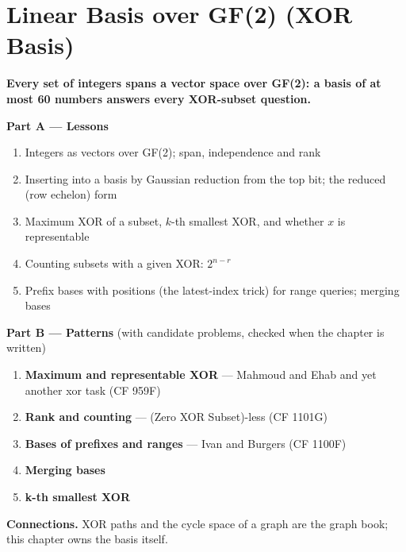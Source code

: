 \chapter{Linear Basis over GF(2) (XOR Basis)}
\label{ch:linear_basis}

\begin{tcolorbox}[enhanced, colback=white, colframe=secondaryblue, boxrule=1pt, arc=2mm]
\textbf{\large\textcolor{primaryblue}{Every set of integers spans a vector space over GF(2): a basis of at most 60 numbers answers every XOR-subset question.}}
\end{tcolorbox}


\begin{plannedbox}
\textbf{Part A --- Lessons}
\begin{enumerate}[leftmargin=*, label=\textbf{A\arabic*.}, itemsep=1pt]
    \item Integers as vectors over GF(2); span, independence and rank
    \item Inserting into a basis by Gaussian reduction from the top bit; the reduced (row echelon) form
    \item Maximum XOR of a subset, $k$-th smallest XOR, and whether $x$ is representable
    \item Counting subsets with a given XOR: $2^{n - r}$
    \item Prefix bases with positions (the latest-index trick) for range queries; merging bases
\end{enumerate}
\textbf{Part B --- Patterns} (with candidate problems, checked when the chapter is written)
\begin{enumerate}[leftmargin=*, label=\textbf{P\arabic*.}, itemsep=1pt]
    \item \textbf{Maximum and representable XOR} --- Mahmoud and Ehab and yet another xor task {\small\color{darkgray}(CF 959F)}
    \item \textbf{Rank and counting} --- (Zero XOR Subset)-less {\small\color{darkgray}(CF 1101G)}
    \item \textbf{Bases of prefixes and ranges} --- Ivan and Burgers {\small\color{darkgray}(CF 1100F)}
    \item \textbf{Merging bases}
    \item \textbf{k-th smallest XOR}
\end{enumerate}
\textbf{Connections.} XOR paths and the cycle space of a graph are the graph book; this chapter owns the basis itself.
\end{plannedbox}
